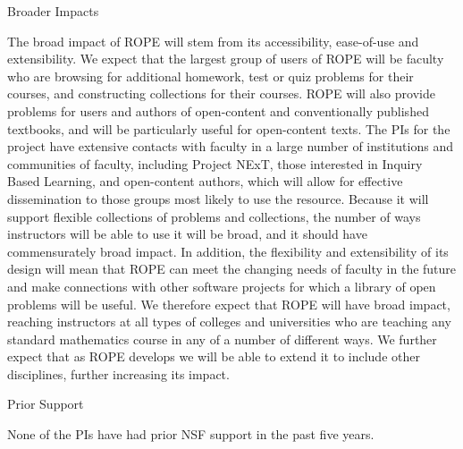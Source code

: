\documentclass[11pt]{article}
\begin{document}
\begin{section}{Broader Impacts}

The broad impact of ROPE will stem from its accessibility, ease-of-use and
extensibility.  We expect that the largest group of users of ROPE will be
faculty who are browsing for additional homework, test or quiz problems
for their courses, and constructing collections for their courses.  ROPE
will also provide problems for users and authors of open-content and
conventionally published textbooks, and will be particularly useful for
open-content texts.  The PIs for the project have extensive contacts with
faculty in a large number of institutions and communities of faculty,
including Project NExT, those interested in Inquiry Based Learning, and
open-content authors, which will allow for effective dissemination to
those groups most likely to use the resource.  Because it will support
flexible collections of problems and collections, the number of ways
instructors will be able to use it will be broad, and it should have
commensurately broad impact.  In addition, the flexibility and
extensibility of its design will mean that ROPE can meet the changing
needs of faculty in the future and make connections with other software
projects for which a library of open problems will be useful.  We
therefore expect that ROPE will have broad impact, reaching instructors at
all types of colleges and universities who are teaching any standard
mathematics course in any of a number of different ways.  We further
expect that as ROPE develops we will be able to extend it to include other
disciplines, further increasing its impact.
\end{section}

\begin{section}{Prior Support}

None of the PIs have had prior NSF support in the past five years.

\end{section}
\end{document}
